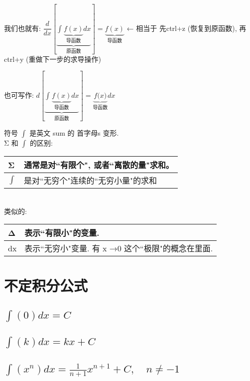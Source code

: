 \documentclass[UTF8]{ctexart}
\begin{document}
	我们也就有:
	$	\dfrac{d}{dx}\left[ \underset{\text{原函数}}{\underbrace{\int_{}^{}{\underset{\text{导函数}}{\underbrace{f\left( x \right) }}dx}}} \right] =\underset{\text{导函数}}{\underbrace{f\left( x \right) }}	$ ← 相当于 先ctrl+z (恢复到原函数), 再 ctrl+y (重做下一步的求导操作)
	
	也可写作:	
	$	d\left[ \underset{\text{原函数}}{\underbrace{\int_{}^{}{\underset{\text{导函数}}{\underbrace{f\left( x \right) }}dx}}} \right] =\underset{\text{导函数}}{\underbrace{f\text{(}x\text{)}}}dx	$
	
	
	
	
	符号 $\int$ 是英文 sum 的 首字母s 变形. \\
	
	
	
	Σ 和 $\int$ 的区别: 
	
	\begin{tabular}{|l| l| }
		\hline
		Σ &  通常是对``有限个", 或者``离散的量"求和。 \\
		\hline
		$\int$ & 是对``无穷个"连续的``无穷小量"的求和 \\
		\hline
	\end{tabular} \\

	类似的:
	
	\begin{tabular}{|l| l| }
		\hline
		Δ & 表示``有限小"的变量. \\
		\hline
		dx & 表示``无穷小"变量. 有 x →0 这个``极限"的概念在里面. \\
		\hline
	\end{tabular}





	
	\section{不定积分公式}
	
	\subsection{$\int (0) dx = C$}
	
	
	\subsection{$\int (k) dx = kx + C$}
	
		
	\subsection{$\int (x^n) dx=\frac{1} {n+1} x^{n+1} + C, \quad n \ne -1$}	
	
\end{document}
